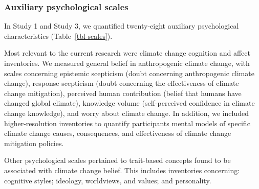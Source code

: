 \documentclass[
  letterpaper,
  DIV=11,
  numbers=noendperiod]{scrartcl}
\begin{document}
\subsubsection{Auxiliary psychological
scales}\label{auxiliary-psychological-scales}

In Study 1 and Study 3, we quantified twenty-eight auxiliary
psychological characteristics (Table~\ref{tbl-scales}).

Most relevant to the current research were climate change cognition and
affect inventories. We measured general belief in anthropogenic climate
change, with scales concerning epistemic scepticism (doubt concerning
anthropogenic climate change), response scepticism (doubt concerning the
effectiveness of climate change mitigation), perceived human
contribution (belief that humans have changed global climate), knowledge
volume (self-perceived confidence in climate change knowledge), and
worry about climate change. In addition, we included higher-resolution
inventories to quantify participants mental models of specific climate
change causes, consequences, and effectiveness of climate change
mitigation policies.

Other psychological scales pertained to trait-based concepts found to be
associated with climate change belief. This includes inventories
concerning: cognitive styles; ideology, worldviews, and values; and
personality.
\end{document}
